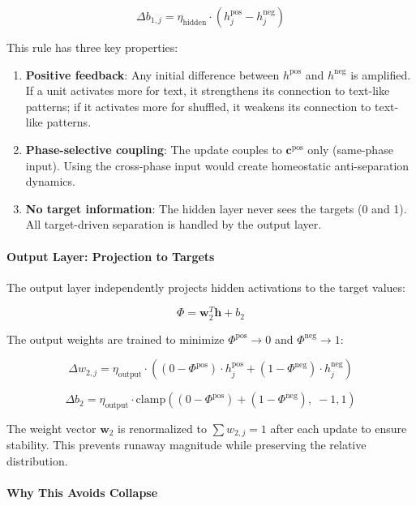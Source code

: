\documentclass[
  11pt,
  a4paper,
]{article}
\providecommand{\tightlist}{%
  \setlength{\itemsep}{0pt}\setlength{\parskip}{0pt}}
\begin{document}
\[
\Delta b_{1,j} = \eta_{\text{hidden}} \cdot (h_j^{\text{pos}} - h_j^{\text{neg}})
\]

This rule has three key properties:

\begin{enumerate}
\def\labelenumi{\arabic{enumi}.}
\tightlist
\item
  \textbf{Positive feedback}: Any initial difference between
  \(h^{\text{pos}}\) and \(h^{\text{neg}}\) is amplified. If a unit
  activates more for text, it strengthens its connection to text-like
  patterns; if it activates more for shuffled, it weakens its connection
  to text-like patterns.
\item
  \textbf{Phase-selective coupling}: The update couples to
  \(\mathbf{c}^{\text{pos}}\) only (same-phase input). Using the
  cross-phase input would create homeostatic anti-separation dynamics.
\item
  \textbf{No target information}: The hidden layer never sees the
  targets (0 and 1). All target-driven separation is handled by the
  output layer.
\end{enumerate}

\paragraph{Output Layer: Projection to
Targets}\label{output-layer-projection-to-targets}

The output layer independently projects hidden activations to the target
values:

\[
\Phi = \mathbf{w}_2^T \mathbf{h} + b_2
\]

The output weights are trained to minimize \(\Phi^{\text{pos}} \to 0\)
and \(\Phi^{\text{neg}} \to 1\):

\[
\Delta w_{2,j} = \eta_{\text{output}} \cdot \left( (0 - \Phi^{\text{pos}}) \cdot h_j^{\text{pos}} + (1 - \Phi^{\text{neg}}) \cdot h_j^{\text{neg}} \right)
\]

\[
\Delta b_2 = \eta_{\text{output}} \cdot \text{clamp}\left( (0 - \Phi^{\text{pos}}) + (1 - \Phi^{\text{neg}}),\; -1, 1 \right)
\]

The weight vector \(\mathbf{w}_2\) is renormalized to
\(\sum w_{2,j} = 1\) after each update to ensure stability. This
prevents runaway magnitude while preserving the relative distribution.

\paragraph{Why This Avoids Collapse}\label{why-this-avoids-collapse}
\end{document}
